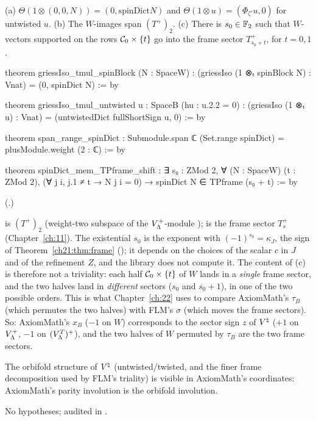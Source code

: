 \begin{theorem}[Blocks]\label{ch21:thm:blocks}
(a) $\Theta(1\otimes(0,0,N))=(0,\mathrm{spinDict}N)$ and $\Theta(1\otimes u)=(\Phi_{\zeta'}u,0)$ for untwisted $u$.
(b) The $W$-images span $(T^+)_2$.
(c) There is $s_0\in\mathbb{F}_2$ such that $W$-vectors supported on the rows $\mathcal{C}_0\times\{t\}$ go into the
frame sector $T^+_{s_0+t}$, for $t=0,1$.
\end{theorem}
\begin{leancode}
theorem griessIso_tmul_spinBlock (N : SpaceW) :
    (griessIso (1 ⊗ₜ spinBlock N) : Vnat) = (0, spinDict N) := by
\end{leancode}
\begin{leancode}
theorem griessIso_tmul_untwisted {u : SpaceB} (hu : u.2.2 = 0) :
    (griessIso (1 ⊗ₜ u) : Vnat) = (untwistedDict fullShortSign u, 0) := by
\end{leancode}
\begin{leancode}
theorem span_range_spinDict :
    Submodule.span ℂ (Set.range spinDict) = plusModule.weight (2 : ℂ) := by
\end{leancode}
\begin{leancode}
theorem spinDict_mem_TPframe_shift :
    ∃ s₀ : ZMod 2, ∀ (N : SpaceW) (t : ZMod 2), (∀ j i, j.1 ≠ t → N j i = 0) →
      spinDict N ∈ TPframe (s₀ + t) := by
\end{leancode}
(.)
\begin{dictionary}
 is $(T^+)_2$ (weight-two subspace of the $V_{\Lambda}^+$-module
);  is the frame sector $T_s^+$ (Chapter~\ref{ch:11}).  The existential
$s_0$ is the exponent with $(-1)^{s_0}=\kappa_J$, the sign of Theorem~\ref{ch21:thm:frame}
(); it depends on the choices of the scalar $c$ in $J$ and of the refinement $Z$,
and the library does not compute it.  The content of (c) is therefore not a triviality: each half
$\mathcal{C}_0\times\{t\}$ of $W$ lands in a \emph{single} frame sector, and the two halves land in
\emph{different} sectors ($s_0$ and $s_0+1$), in one of the two possible orders.  This is what
Chapter~\ref{ch:22} uses to compare AxiomMath's $\tau_B$ (which permutes the two halves) with FLM's $\sigma$
(which moves the frame sectors).  So: AxiomMath's $x_B$ ($-1$ on $W$) corresponds to the sector sign $z$ of
${V^{\natural}}$ ($+1$ on $V_{\Lambda}^+$, $-1$ on $(V_{\Lambda}^T)^+$), and the two halves of $W$ permuted by $\tau_B$
are the two frame sectors.
\end{dictionary}
\begin{physics}
The orbifold structure of ${V^{\natural}}$ (untwisted/twisted, and the finer frame decomposition used by FLM's
triality) is visible in AxiomMath's coordinates: AxiomMath's parity involution is the orbifold
involution.
\end{physics}
\begin{status}
No hypotheses; audited in .
\end{status}

